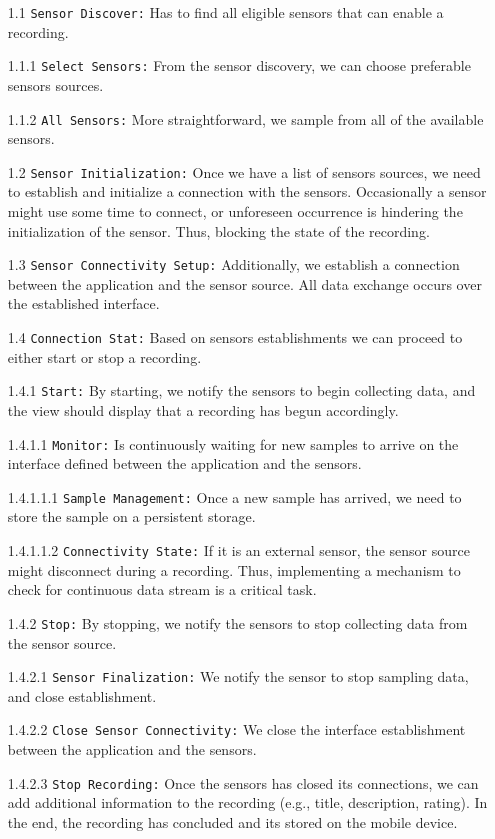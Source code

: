\begin{itemize}
    \item[1.1] \verb|Sensor Discover:| Has to find all eligible sensors that can enable a recording.
    \item[1.1.1] \verb|Select Sensors:| From the sensor discovery, we can choose preferable sensors sources.
    \item[1.1.2] \verb|All Sensors:| More straightforward, we sample from all of the available sensors.
    \item[1.2] \verb|Sensor Initialization:| Once we have a list of sensors sources, we need to establish and initialize a connection with the sensors. Occasionally a sensor might use some time to connect, or unforeseen occurrence is hindering the initialization of the sensor. Thus, blocking the state of the recording. 
    \item[1.3] \verb|Sensor Connectivity Setup:| Additionally, we establish a connection between the application and the sensor source. All data exchange occurs over the established interface. 
    \item[1.4] \verb|Connection Stat:| Based on sensors establishments we can proceed to either start or stop a recording. 
    \item[1.4.1] \verb|Start:| By starting, we notify the sensors to begin collecting data, and the view should display that a recording has begun accordingly.
    \item[1.4.1.1] \verb|Monitor:| Is continuously waiting for new samples to arrive on the interface defined between the application and the sensors.
    \item[1.4.1.1.1] \verb|Sample Management:| Once a new sample has arrived, we need to store the sample on a persistent storage.
    \item[1.4.1.1.2] \verb|Connectivity State:| If it is an external sensor, the sensor source might disconnect during a recording. Thus, implementing a mechanism to check for continuous data stream is a critical task.
    \item[1.4.2] \verb|Stop:| By stopping, we notify the sensors to stop collecting data from the sensor source.
    \item[1.4.2.1] \verb|Sensor Finalization:| We notify the sensor to stop sampling data, and close establishment.
    \item[1.4.2.2] \verb|Close Sensor Connectivity:| We close the interface establishment between the application and the sensors. 
    \item[1.4.2.3] \verb|Stop Recording:| Once the sensors has closed its connections, we can add additional information to the recording (e.g., title, description, rating). In the end, the recording has concluded and its stored on the mobile device.
\end{itemize}

